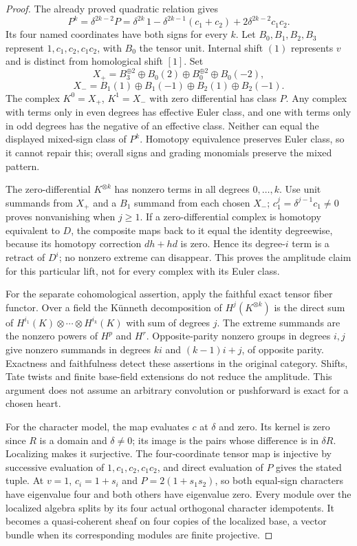 \documentclass[11pt,a4paper]{article}
\theoremstyle{named}\newtheorem{finding}{Finding}[section]
\theoremstyle{definition}\newtheorem{definition}[finding]{Definition}
\theoremstyle{remark}\newtheorem{remark}[finding]{Remark}
\begin{document}
\begin{proof}
The already proved quadratic relation gives
\[
 P^k=\delta^{2k-2}P
 =\delta^{2k}\,1-\delta^{2k-1}(c_1+c_2)
                  +2\delta^{2k-2}c_1c_2.
\]
Its four named coordinates have both signs for every $k$.
Let $B_0,B_1,B_2,B_3$ represent $1,c_1,c_2,c_1c_2$, with $B_0$ the
tensor unit. Internal shift $(1)$ represents $v$ and is distinct
from homological shift $[1]$. Set
\[
 X_+=B_3^{\oplus2}\oplus B_0(2)\oplus B_0^{\oplus2}\oplus B_0(-2),
\]
\[
 X_-=B_1(1)\oplus B_1(-1)\oplus B_2(1)\oplus B_2(-1).
\]
The complex $K^0=X_+$, $K^1=X_-$ with zero differential has class
$P$. Any complex with terms only in even degrees has effective Euler
class, and one with terms only in odd degrees has the negative of an
effective class. Neither can equal the displayed mixed-sign class of
$P^k$. Homotopy equivalence preserves Euler class, so it cannot repair
this; overall signs and grading monomials preserve the mixed pattern.

The zero-differential $K^{\otimes k}$ has nonzero terms in all degrees
$0,\ldots,k$. Use unit summands from $X_+$ and a $B_1$ summand from
each chosen $X_-$; $c_1^j=\delta^{j-1}c_1\ne0$ proves nonvanishing
when $j\ge1$. If a zero-differential complex is homotopy equivalent
to $D$, the composite maps back to it equal the identity degreewise,
because its homotopy correction $dh+hd$ is zero. Hence its degree-$i$
term is a retract of $D^i$; no nonzero extreme can disappear. This
proves the amplitude claim for this particular lift, not for every
complex with its Euler class.

For the separate cohomological assertion, apply the faithful exact
tensor fiber functor. Over a field the K\"unneth decomposition of
$H^j(K^{\otimes k})$ is the direct sum of
$H^{i_1}(K)\otimes\cdots\otimes H^{i_k}(K)$ with sum of degrees $j$.
The extreme summands are the nonzero powers of $H^p$ and $H^r$.
Opposite-parity nonzero groups in degrees $i,j$ give nonzero summands
in degrees $ki$ and $(k-1)i+j$, of opposite parity. Exactness and
faithfulness detect these assertions in the original category.
Shifts, Tate twists and finite base-field extensions do not reduce
the amplitude. This argument does not assume an arbitrary convolution
or pushforward is exact for a chosen heart.

For the character model, the map evaluates $c$ at $\delta$ and zero.
Its kernel is zero since $R$ is a domain and $\delta\ne0$; its image
is the pairs whose difference is in $\delta R$. Localizing makes it
surjective. The four-coordinate tensor map is injective by successive
evaluation of $1,c_1,c_2,c_1c_2$, and direct evaluation of $P$ gives
the stated tuple. At $v=1$, $c_i=1+s_i$ and $P=2(1+s_1s_2)$,
so both equal-sign characters have eigenvalue four and both others
have eigenvalue zero. Every module over the localized algebra splits
by its four actual orthogonal character idempotents. It becomes a
quasi-coherent sheaf on four copies of the localized base, a vector
bundle when its corresponding modules are finite projective.


\end{proof}
\end{document}
